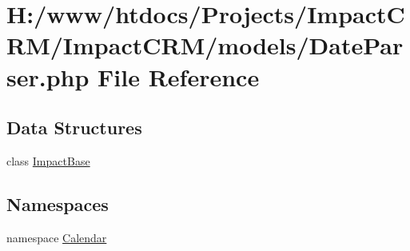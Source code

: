 \hypertarget{DateParser_8php}{
\section{H:/www/htdocs/Projects/ImpactCRM/ImpactCRM/models/DateParser.php File Reference}
\label{DateParser_8php}
}
\subsection*{Data Structures}
\begin{DoxyCompactItemize}
\item 
class \hyperlink{classImpactBase}{ImpactBase}
\end{DoxyCompactItemize}
\subsection*{Namespaces}
\begin{DoxyCompactItemize}
\item 
namespace \hyperlink{namespaceCalendar}{Calendar}
\end{DoxyCompactItemize}
